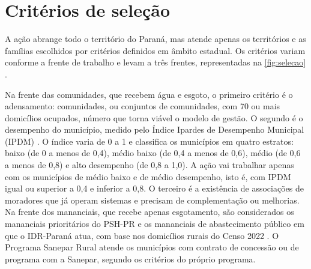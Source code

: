 \FloatBarrier
\section{Critérios de seleção}
\label{sec:criterios}

A ação abrange todo o território do Paraná, mas atende apenas os territórios e
as famílias escolhidos por critérios definidos em âmbito estadual. Os critérios
variam conforme a frente de trabalho e levam a três frentes, representadas na
\autoref{fig:selecao} \cite{mop2026}.

Na frente das comunidades, que recebem água e esgoto, o primeiro critério é o
adensamento: comunidades, ou conjuntos de comunidades, com 70 ou mais
domicílios ocupados, número que torna viável o modelo de gestão. O segundo é o
desempenho do município, medido pelo Índice Ipardes de Desempenho Municipal
(IPDM) \cite{ipdm}. O índice varia de 0 a 1 e classifica os municípios em
quatro estratos: baixo (de 0 a menos de 0,4), médio baixo (de 0,4 a menos de
0,6), médio (de 0,6 a menos de 0,8) e alto desempenho (de 0,8 a 1,0). A ação
vai trabalhar apenas com os municípios de médio baixo e de médio desempenho,
isto é, com IPDM igual ou superior a 0,4 e inferior a 0,8. O terceiro é a
existência de associações de moradores que já operam sistemas e precisam de
complementação ou melhorias. Na frente dos mananciais, que recebe apenas
esgotamento, são considerados os mananciais prioritários do PSH-PR e os
mananciais de abastecimento público em que o IDR-Paraná atua, com base nos
domicílios rurais do Censo 2022 \cite{ibge2022}. O Programa Sanepar Rural atende
os municípios com contrato de concessão ou de programa com a Sanepar, segundo
os critérios do próprio programa.

